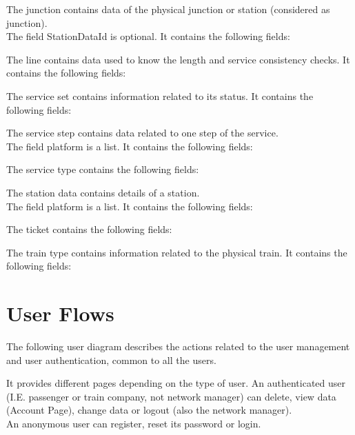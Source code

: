The junction contains data of the physical junction or station (considered as junction). \\
The field StationDataId is optional. It contains the following fields:

The line contains data used to know the length and service consistency checks. It contains the following fields:

The service set contains information related to its status. It contains the following fields:

The service step contains data related to one step of the service.\\
The field platform is a list. It contains the following fields:

The service type contains the following fields:

The station data contains details of a station.\\
The field platform is a list. It contains the following fields:

The ticket contains the following fields:

The train type contains information related to the physical train. It contains the following fields:

\section{User Flows}

The following user diagram describes the actions related to the user management and user authentication, common to all the users.

It provides different pages depending on the type of user. An authenticated user (I.E. passenger or train company, not network manager) can delete, view data (Account Page), change data or logout (also the network manager).\\
An anonymous user can register, reset its password or login.


